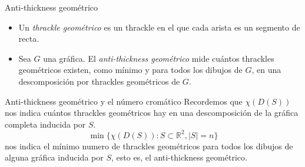 \begin{frame}{Anti-thickness geométrico}
\begin{itemize}
	\item Un \emph{thrackle geométrico} es un thrackle en el que cada arista es un segmento de recta.
	\item[] Sea $G$ una gráfica. El \emph{anti-thickness geométrico} mide cuántos thrackles geométricos existen, como mínimo y para todos los dibujos de $G$, en una descomposición por thrackles geométricos de $G$.
\end{itemize}

\end{frame}
\begin{frame}{Anti-thickness geométrico y el número cromático}
Recordemos que $\chi(D(S))$ nos indica cuántos thrackles geométricos hay en una descomposición de la gráfica completa inducida por $S$. 
\[
\min\{ \chi(D(S)) : S \subset \mathbb{R}^2, |S| = n \}
\] nos indica el mínimo numero de thrackles geométricos para todos los dibujos de alguna gráfica inducida por $S$, esto es, el anti-thickness geométrico.
\end{frame}




